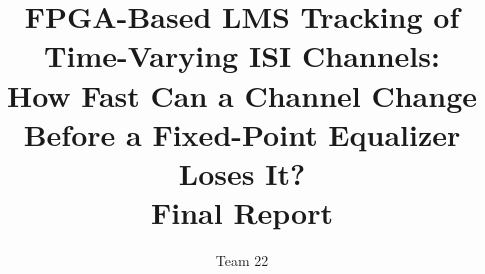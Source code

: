 \documentclass[10pt,twocolumn,letterpaper]{article}
\begin{document}
\title{FPGA-Based LMS Tracking of Time-Varying ISI Channels:\\
How Fast Can a Channel Change Before a Fixed-Point Equalizer Loses It?\\
{\large Final Report}}

\author{Team 22}
\maketitle














\end{document}
